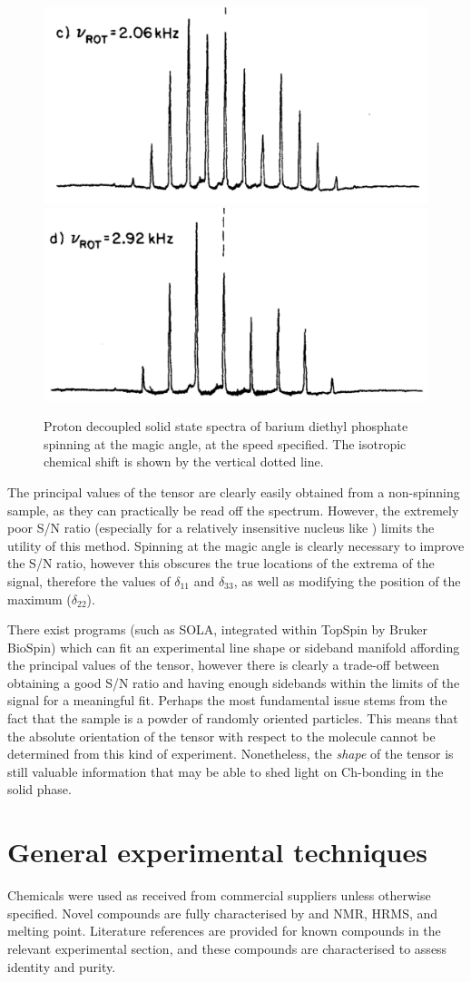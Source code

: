 \begin{refsection}
\begin{figure}
    \includegraphics[width=0.45\linewidth]{Figures/31P-ssnmr-2.06khz.pdf}
    \includegraphics[width=0.45\linewidth]{Figures/31P-ssnmr-2.92khz.pdf}
    \caption[-SS-NMR spinning at the magic angle.]{Proton decoupled solid state  spectra of barium diethyl phosphate spinning at the magic angle, at the speed specified. The isotropic chemical shift is shown by the vertical dotted line.}\label{fig:31P-ssnmr}
\end{figure}

The principal values of the tensor are clearly easily obtained from a non-spinning sample, as they can practically be read off the spectrum.
However, the extremely poor S/N ratio (especially for a relatively insensitive nucleus like ) limits the utility of this method.
Spinning at the magic angle is clearly necessary to improve the S/N ratio, however this obscures the true locations of the extrema of the signal, therefore the values of $ \delta_{11} $ and $ \delta_{33} $, as well as modifying the position of the maximum ($ \delta_{22} $).

There exist programs (such as SOLA, integrated within TopSpin by Bruker BioSpin) which can fit an experimental line shape or sideband manifold affording the principal values of the tensor, however there is clearly a trade-off between obtaining a good S/N ratio and having enough sidebands within the limits of the signal for a meaningful fit.
Perhaps the most fundamental issue stems from the fact that the sample is a powder of randomly oriented particles.
This means that the absolute orientation of the tensor with respect to the molecule cannot be determined from this kind of experiment.
Nonetheless, the \emph{shape} of the tensor is still valuable information that may be able to shed light on Ch-bonding in the solid phase.

\section{General experimental techniques}
Chemicals were used as received from commercial suppliers unless otherwise specified.
Novel compounds are fully characterised by  and  NMR, HRMS, and melting point.
Literature references are provided for known compounds in the relevant experimental section, and these compounds are characterised to assess identity and purity.


\end{refsection}
